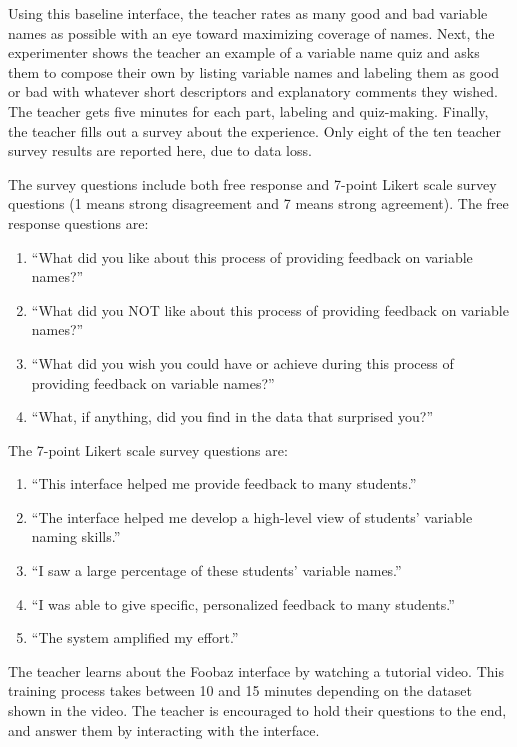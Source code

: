 Using this baseline interface, the teacher rates as many good and bad variable names as possible with an eye toward maximizing coverage of names. Next, the experimenter shows the teacher an example of a variable name quiz and asks them to compose their own by listing variable names and labeling them as good or bad with whatever short descriptors and explanatory comments they wished. The teacher gets five minutes for each part, labeling and quiz-making. Finally, the teacher fills out a survey about the experience. Only eight of the ten teacher survey results are reported here, due to data loss.

The survey questions include both free response and 7-point Likert scale survey questions (1 means strong disagreement and 7 means strong agreement). The free response questions are:
\begin{enumerate} 
\item ``What did you like about this process of providing feedback on variable names?''
\item ``What did you NOT like about this process of providing feedback on variable names?'' 
\item ``What did you wish you could have or achieve during this process of providing feedback on variable names?'' 
\item ``What, if anything, did you find in the data that surprised you?''
\end{enumerate}
The 7-point Likert scale survey questions are:
\begin{enumerate}
\item ``This interface helped me provide feedback to many students.''
\item ``The interface helped me develop a high-level view of students' variable naming skills.''
\item ``I saw a large percentage of these students' variable names.''
\item ``I was able to give specific, personalized feedback to many students.''
\item ``The system amplified my effort.''
\end{enumerate}


The teacher learns about the Foobaz interface by watching a tutorial video. This training process takes between 10 and 15 minutes depending on the dataset shown in the video. The teacher is encouraged to hold their questions to the end, and answer them by interacting with the interface.

